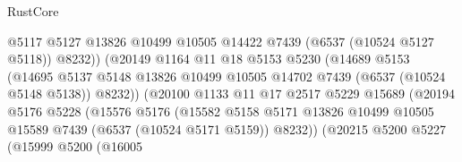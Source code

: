 \begin{lexlean}{RustCore}
\begin{coremodule}
                                      @5117
                                      @5127
                                      @13826
                                      @10499
                                      @10505
                                      @14422
                                      @7439
                                      (@6537 (@10524 @5127 @5118))
                                      @8232))
                                  (@20149
                                    @1164
                                    @11
                                    @18
                                    @5153
                                    @5230
                                    (@14689
                                      @5153
                                      (@14695
                                        @5137
                                        @5148
                                        @13826
                                        @10499
                                        @10505
                                        @14702
                                        @7439
                                        (@6537 (@10524 @5148 @5138))
                                        @8232))
                                    (@20100
                                      @1133
                                      @11
                                      @17
                                      @2517
                                      @5229
                                      @15689
                                      (@20194
                                        @5176
                                        @5228
                                        (@15576
                                          @5176
                                          (@15582
                                            @5158
                                            @5171
                                            @13826
                                            @10499
                                            @10505
                                            @15589
                                            @7439
                                            (@6537 (@10524 @5171 @5159))
                                            @8232))
                                        (@20215
                                          @5200
                                          @5227
                                          (@15999
                                            @5200
                                            (@16005

\end{coremodule}
\end{lexlean}
